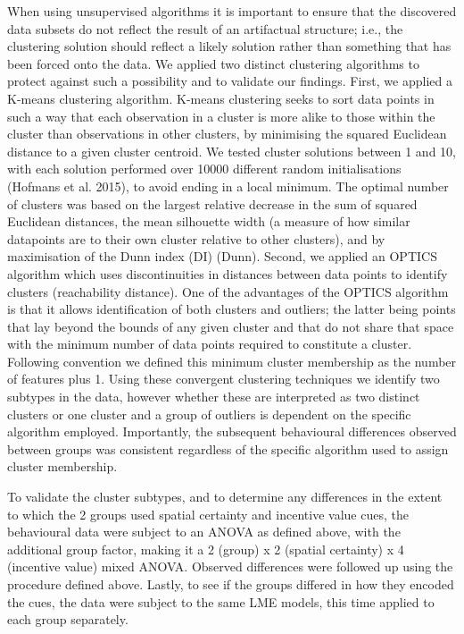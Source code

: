 \documentclass[11pt,halfline,a4paper,]{ouparticle}
\begin{document}
When using unsupervised algorithms it is important to ensure that the discovered data subsets do not reflect the result of an artifactual structure; i.e., the clustering solution should reflect a likely solution rather than something that has been forced onto the data. We applied two distinct clustering algorithms to protect against such a possibility and to validate our findings. First, we applied a K-means clustering algorithm. K-means clustering seeks to sort data points in such a way that each observation in a cluster is more alike to those within the cluster than observations in other clusters, by minimising the squared Euclidean distance to a given cluster centroid. We tested cluster solutions between 1 and 10, with each solution performed over 10000 different random initialisations (Hofmans et al. 2015), to avoid ending in a local minimum. The optimal number of clusters was based on the largest relative decrease in the sum of squared Euclidean distances, the mean silhouette width (a measure of how similar datapoints are to their own cluster relative to other clusters), and by maximisation of the Dunn index (DI) (Dunn). Second, we applied an OPTICS algorithm which uses discontinuities in distances between data points to identify clusters (reachability distance). One of the advantages of the OPTICS algorithm is that it allows identification of both clusters and outliers; the latter being points that lay beyond the bounds of any given cluster and that do not share that space with the minimum number of data points required to constitute a cluster. Following convention we defined this minimum cluster membership as the number of features plus 1. Using these convergent clustering techniques we identify two subtypes in the data, however whether these are interpreted as two distinct clusters or one cluster and a group of outliers is dependent on the specific algorithm employed. Importantly, the subsequent behavioural differences observed between groups was consistent regardless of the specific algorithm used to assign cluster membership.

To validate the cluster subtypes, and to determine any differences in the extent to which the 2 groups used spatial certainty and incentive value cues, the behavioural data were subject to an ANOVA as defined above, with the additional group factor, making it a 2 (group) x 2 (spatial certainty) x 4 (incentive value) mixed ANOVA. Observed differences were followed up using the procedure defined above. Lastly, to see if the groups differed in how they encoded the cues, the data were subject to the same LME models, this time applied to each group separately.
\end{document}
